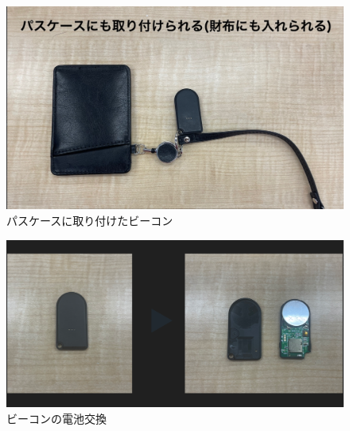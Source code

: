\begin{figure}[H]
  \begin{center}
    \includegraphics[width=150mm]{image/beaconForpass.jpg}
    \caption{パスケースに取り付けたビーコン}
    \label{fig:beaconforpass}
  \end{center}
\end{figure}

\begin{figure}[H]
  \begin{center}
    \includegraphics[width=150mm]{image/batchange.png}
    \caption{ビーコンの電池交換}
    \label{fig:batchange}
  \end{center}
\end{figure}

